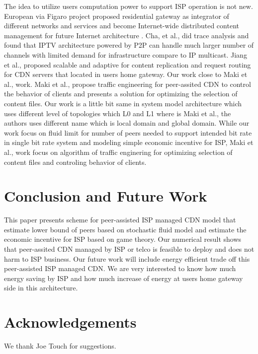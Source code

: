 \documentclass[paper]{ieice}
\begin{document}
The idea to utilize users computation power to support ISP operation is not new.  
European via Figaro project \cite{figaro} proposed residential gateway as integrator of different networks and services and become Internet-wide distributed content management for future Internet architecture \cite{figaro}. 
Cha, et al.,\cite{Cha:2008:NTP:1855641.1855646} did trace analysis and found that IPTV architecture powered by P2P can handle much larger number of channels with limited demand for infrastructure compare to IP multicast. 
Jiang et al., \cite{Jiang:2012:OMD:2413176.2413193} proposed scalable and adaptive for content replication and request routing for CDN servers that located in users home gateway. 
Our work close to Maki et al.,\cite{NaoyaMAKI2012} work.  
Maki et al.,\cite{NaoyaMAKI2012} propose traffic engineering for peer-assited CDN to control the behavior of clients and presents a solution for optimizing the selection of content files.
Our work is a little bit same in system model architecture which uses different level of topologies which L0 and L1 where is Maki et al., \cite{NaoyaMAKI2012} the authors uses different name which is local domain and global domain. 
While our work focus on fluid limit for number of peers needed to support intended bit rate in single bit rate system and modeling simple economic incentive for ISP, Maki et al., \cite{NaoyaMAKI2012} work focus on algorithm of traffic enginering for optimizing selection of content files and controling behavior of clients.

\section{Conclusion and Future Work}\label{conclude}
This paper presents scheme for peer-assisted ISP managed CDN model that estimate lower bound of peers based on stochastic fluid model and estimate the economic incentive for ISP based on game theory.  
Our numerical result shows that peer-assited CDN managed by ISP or telco is feasible to deploy and does not harm to ISP business. 
Our future work will include energy efficient trade off this peer-assisted ISP managed CDN. 
We are very interested to know how much energy saving by ISP and how much increase of energy at users home gateway side in this architecture. 





\section*{Acknowledgements}
We thank Joe Touch for suggestions.
\end{document}
